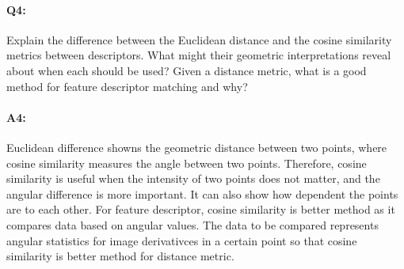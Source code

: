 

\pagebreak
\paragraph{Q4:} Explain the difference between the Euclidean distance and the cosine similarity metrics between descriptors. What might their geometric interpretations reveal about when each should be used? Given a distance metric, what is a good method for feature descriptor matching and why?

\paragraph{A4:} Euclidean difference showns the geometric distance between two points, where cosine similarity measures the angle between two points. Therefore, cosine similarity is useful when the intensity of two points does not matter, and the angular difference is more important. It can also show how dependent the points are to each other. For feature descriptor, cosine similarity is better method as it compares data based on angular values. The data to be compared represents angular statistics for image derivativces in a certain point so that cosine similarity is better method for distance metric. 









